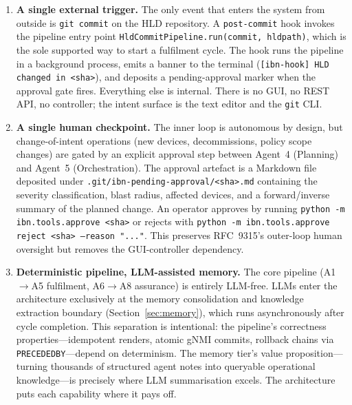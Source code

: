 \documentclass[acmtog]{acmart}
\renewcommand\_{\textunderscore\allowbreak}
\begin{document}
\begin{enumerate}[label=\textbf{AC\arabic*.}]
  \item \textbf{A single external trigger.} The only event that
    enters the system from outside is \texttt{git commit} on the HLD
    repository. A \texttt{post-commit} hook invokes the pipeline entry
    point \texttt{HldCommit\-Pipeline.run(\allowbreak commit, hld\_path)}, which is
    the sole supported way to start a fulfilment cycle. The hook
    runs the pipeline in a background process, emits a banner to the
    terminal (\texttt{[ibn-hook] HLD changed in <sha>}), and deposits
    a pending-approval marker when the approval gate fires. Everything
    else is internal. There is no GUI, no REST API, no controller; the
    intent surface is the text editor and the \texttt{git} CLI.

  \item \textbf{A single human checkpoint.} The inner loop is
    autonomous by design, but change-of-intent operations (new
    devices, decommissions, policy scope changes) are gated by an
    explicit approval step between Agent~4 (Planning) and Agent~5
    (Orchestration). The approval artefact is a Markdown file
    deposited under \texttt{.git/\allowbreak{}ibn-pending-approval/\allowbreak{}<sha>.md}
    containing the severity classification, blast radius, affected
    devices, and a forward/inverse summary of the planned change. An
    operator approves by running \texttt{python -m ibn.tools.approve
    <sha>} or rejects with \texttt{python -m ibn.tools.approve reject
    <sha> --reason "..."}. This preserves RFC~9315's outer-loop human
    oversight but removes the GUI-controller dependency.

  \item \textbf{Deterministic pipeline, LLM-assisted memory.} The
    core pipeline (A1$\rightarrow$A5 fulfilment, A6$\rightarrow$A8
    assurance) is entirely LLM-free. LLMs enter the architecture
    exclusively at the memory consolidation and knowledge extraction
    boundary (Section~\ref{sec:memory}), which runs asynchronously
    after cycle completion. This separation is intentional: the
    pipeline's correctness properties---idempotent renders, atomic
    gNMI commits, rollback chains via \texttt{PRECEDED\_BY}---depend
    on determinism. The memory tier's value proposition---turning
    thousands of structured agent notes into queryable operational
    knowledge---is precisely where LLM summarisation excels. The
    architecture puts each capability where it pays off.
\end{enumerate}
\end{document}
